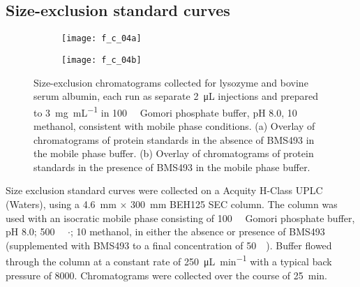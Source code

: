 \begin{refsection}
\section{Size-exclusion standard curves}
\begin{figure}
    \centering
    \begin{subfigure}[b]{0.8\textwidth}
        \texttt{[image: f\_c\_04a]}
        \caption{}
    \end{subfigure}
    \begin{subfigure}[b]{0.8\textwidth}
        \texttt{[image: f\_c\_04b]}
        \caption{}
    \end{subfigure}
    \caption{Size-exclusion chromatograms collected for lysozyme and bovine
        serum albumin, each run as separate \SI{2}{\micro\liter} injections and
        prepared to \SI{3}{\mg\per\mL} in \SI{100}{\milli\moLar} Gomori
        phosphate buffer, pH 8.0, \SI{10}{\volper} methanol, consistent with
        mobile phase conditions. (a) Overlay of chromatograms of protein
        standards in the absence of BMS493 in the mobile phase buffer. (b)
        Overlay of chromatograms of protein standards in the presence of BMS493
        in the mobile phase buffer.}\label{fig:sec_standards}
\end{figure}
Size exclusion standard curves were collected on a Acquity H-Class UPLC
(Waters), using a \SI{4.6}{\mm} ${\times}$ \SI{300}{\mm} BEH125 SEC column. The
column was used with an isocratic mobile phase consisting of
\SI{100}{\milli\moLar} Gomori phosphate buffer, pH 8.0;
\SI{500}{\milli\moLar} ${\cdot}$;
\SI{10}{\volper} methanol, 
in either the absence or presence of BMS493 (supplemented with BMS493 to a final
concentration of \SI{50}{\micro\moLar}). Buffer flowed through the column at a
constant rate of \SI{250}{\uL\per\minute} with a typical back pressure of
\SI{8000}{\psi}. Chromatograms were collected over the
course of \SI{25}{\minute}.

\end{refsection}
